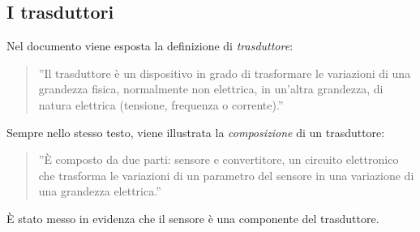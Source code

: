 \documentclass[a4paper]{report} %
\begin{document}

\subsection{I trasduttori}
Nel documento \cite{art:rif.11} viene esposta la definizione di \textit{trasduttore}:
\begin{quote}
	''Il trasduttore è un dispositivo in grado di trasformare le variazioni di una grandezza fisica, normalmente non elettrica, in un'altra grandezza, di natura elettrica (tensione, frequenza o corrente).''
\end{quote}
Sempre nello stesso testo, viene illustrata la \textit{composizione} di un trasduttore:
\begin{quote}
	''È composto da due parti: sensore e convertitore, un circuito elettronico che trasforma le variazioni di un parametro del sensore in una variazione di una grandezza elettrica.'' 
\end{quote}
È stato messo in evidenza che il sensore è una componente del trasduttore.
\end{document}
